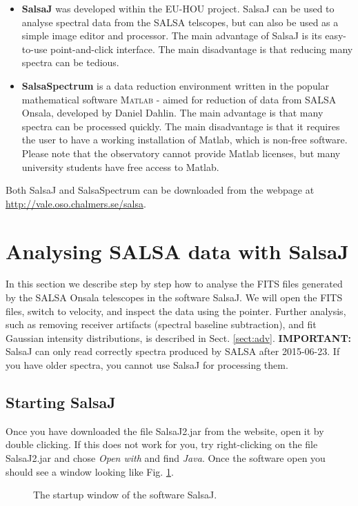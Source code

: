 \documentclass[11pt,a4paper]{article}
\begin{document}
\begin{itemize}
\item \textbf{SalsaJ} was developed within the EU-HOU project.
	SalsaJ can be used to analyse spectral data from the SALSA telscopes, but
	can also be used as a simple image editor and processor.  The main
	advantage of SalsaJ is its easy-to-use point-and-click interface. The main
	disadvantage is that reducing many spectra can be tedious.
\item \textbf{SalsaSpectrum} is a data reduction environment written
  in the popular mathematical software \textsc{\textsc{Matlab}} -
  aimed for reduction of data from SALSA Onsala, developed by Daniel
  Dahlin. The main advantage is that many spectra can be processed
  quickly. The main disadvantage is that it requires the user to have
  a working installation of Matlab, which is non-free software. Please note 
  that the observatory cannot provide Matlab licenses, but many university
  students have free access to Matlab.
\end{itemize}
Both SalsaJ and SalsaSpectrum can be downloaded from the webpage at
{\url{http://vale.oso.chalmers.se/salsa}}. 

\section{Analysing SALSA data with SalsaJ}
\label{sec:salsaj}
In this section we describe step by step how to analyse the FITS files
generated by the SALSA Onsala telescopes in the software SalsaJ. We will
open the FITS files, switch to velocity, and inspect the data using the
pointer. Further analysis, such as removing receiver artifacts 
(spectral baseline subtraction), and fit Gaussian intensity distributions,
is described in Sect. \ref{sect:adv}.
\textbf{IMPORTANT:} SalsaJ can only read correctly spectra produced by SALSA after
2015-06-23.  If you have older spectra, you cannot use SalsaJ for processing
them.

\subsection{Starting SalsaJ}
Once you have downloaded the file SalsaJ2.jar from the website, 
open it by double clicking. If this does not work for you, 
try right-clicking on the file SalsaJ2.jar and chose \emph{Open with}
and find \emph{Java}. Once the software open you should see a window looking
like Fig. \ref{fig:salsajstart}.
\begin{figure}[h!]
  \centering
  \caption{The startup window of the software SalsaJ.}
  \label{fig:salsajstart}
\end{figure}
\end{document}
